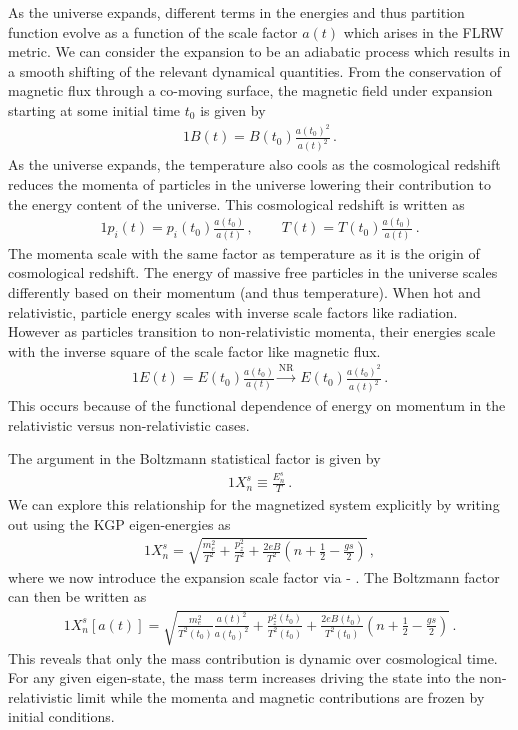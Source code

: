 As the universe expands, different terms in the energies and thus partition function evolve as a function of the scale factor $a(t)$ which arises in the FLRW metric. We can consider the expansion to be an adiabatic process which results in a smooth shifting of the relevant dynamical quantities. From the conservation of magnetic flux through a co-moving surface, the magnetic field under expansion starting at some initial time $t_{0}$ is given by
\begin{alignat}{1}
    \label{BScale} B(t) = B(t_{0})\frac{a(t_{0})^{2}}{a(t)^{2}}\,.
\end{alignat}
As the universe expands, the temperature also cools as the cosmological redshift reduces the momenta of particles in the universe lowering their contribution to the energy content of the universe. This cosmological redshift is written as
\begin{alignat}{1}
  \label{Redshift} p_{i}(t) = p_{i}(t_{0})\frac{a(t_{0})}{a(t)}\,,\qquad T(t) = T(t_{0})\frac{a(t_{0})}{a(t)}\,.
\end{alignat}
The momenta scale with the same factor as temperature as it is the origin of cosmological redshift. The energy of massive free particles in the universe scales differently based on their momentum (and thus temperature). When hot and relativistic, particle energy scales with inverse scale factors like radiation. However as particles transition to non-relativistic momenta, their energies scale with the inverse square of the scale factor like magnetic flux.
\begin{alignat}{1}
    \label{EScale} E(t) = E(t_{0})\frac{a(t_{0})}{a(t)}\xrightarrow{\mathrm{NR}}\  E(t_{0})\frac{a(t_{0})^{2}}{a(t)^{2}}\,.
\end{alignat}
This occurs because of the functional dependence of energy on momentum in the relativistic versus non-relativistic cases.

The argument in the Boltzmann statistical factor is given by
\begin{alignat}{1}
    \label{Boltz} X_{n}^{s}\equiv\frac{E_{n}^{s}}{T}\,.
\end{alignat}
We can explore this relationship for the magnetized system explicitly by writing out  using the KGP eigen-energies as
\begin{alignat}{1}
    \label{XExplicit} X_{n}^{s} = \sqrt{\frac{m_{e}^{2}}{T^{2}}+\frac{p_{z}^{2}}{T^{2}}+\frac{2eB}{T^{2}}\left(n+\frac{1}{2}-\frac{gs}{2}\right)}\,,
\end{alignat}
where we now introduce the expansion scale factor via  - . The Boltzmann factor can then be written as
\begin{alignat}{1}
    \label{XScale} X_{n}^{s}[a(t)] = \sqrt{\frac{m_{e}^{2}}{T^{2}(t_{0})}\frac{a(t)^{2}}{a(t_{0})^{2}}+\frac{p_{z}^{2}(t_{0})}{T^{2}(t_{0})}+\frac{2eB(t_{0})}{T^{2}(t_{0})}\left(n+\frac{1}{2}-\frac{gs}{2}\right)}\,.
\end{alignat}
This reveals that only the mass contribution is dynamic over cosmological time. For any given eigen-state, the mass term increases driving the state into the non-relativistic limit while the momenta and magnetic contributions are frozen by initial conditions. 

